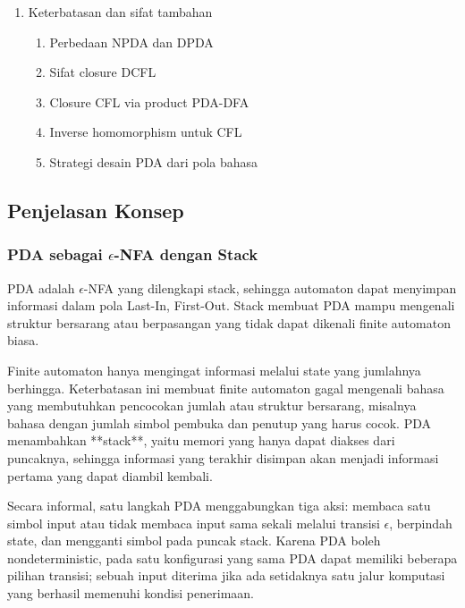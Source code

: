 \begin{enumerate}
\begin{enumerate}
        \item \ppaham Prefix property dan unambiguous CFG
    \end{enumerate}
    \item \ppaham Keterbatasan dan sifat tambahan
    \begin{enumerate}
        \item \ppaham Perbedaan NPDA dan DPDA
        \item \ppaham Sifat closure DCFL
        \item \ppaham Closure CFL via product PDA-DFA
        \item \ppaham Inverse homomorphism untuk CFL
        \item \ppaham Strategi desain PDA dari pola bahasa
    \end{enumerate}
\end{enumerate}

\subsection{Penjelasan Konsep}

\subsubsection{\texorpdfstring{PDA sebagai $\epsilon$-NFA dengan Stack}{PDA sebagai epsilon-NFA dengan Stack}}

\begin{jawab}
PDA adalah $\epsilon$-NFA yang dilengkapi stack, sehingga automaton dapat menyimpan informasi dalam pola Last-In, First-Out. Stack membuat PDA mampu mengenali struktur bersarang atau berpasangan yang tidak dapat dikenali finite automaton biasa.
\end{jawab}

Finite automaton hanya mengingat informasi melalui state yang jumlahnya berhingga. Keterbatasan ini membuat finite automaton gagal mengenali bahasa yang membutuhkan pencocokan jumlah atau struktur bersarang, misalnya bahasa dengan jumlah simbol pembuka dan penutup yang harus cocok. PDA menambahkan **stack**, yaitu memori yang hanya dapat diakses dari puncaknya, sehingga informasi yang terakhir disimpan akan menjadi informasi pertama yang dapat diambil kembali.

Secara informal, satu langkah PDA menggabungkan tiga aksi: membaca satu simbol input atau tidak membaca input sama sekali melalui transisi $\epsilon$, berpindah state, dan mengganti simbol pada puncak stack. Karena PDA boleh nondeterministic, pada satu konfigurasi yang sama PDA dapat memiliki beberapa pilihan transisi; sebuah input diterima jika ada setidaknya satu jalur komputasi yang berhasil memenuhi kondisi penerimaan.

